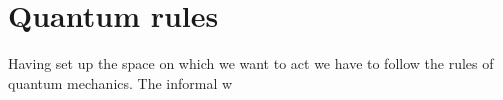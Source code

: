 \section{Quantum rules}
Having set up the space on which we want to act we have to follow the rules of quantum mechanics. The informal w